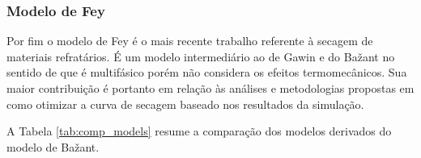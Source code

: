     \subsubsection{Modelo de Fey}
    Por fim o modelo de Fey \cite{Fey2016b} é o mais recente trabalho referente à secagem de
    materiais refratários. É um modelo intermediário ao de Gawin e do Ba\v{z}ant
    no sentido de que é multifásico porém não considera os efeitos
    termomecânicos. Sua maior contribuição é portanto em relação às análises e
    metodologias propostas em como otimizar a curva de secagem baseado nos
    resultados da simulação.

    A Tabela \ref{tab:comp_models} resume a comparação dos modelos derivados do
    modelo de Ba\v{z}ant.


    
